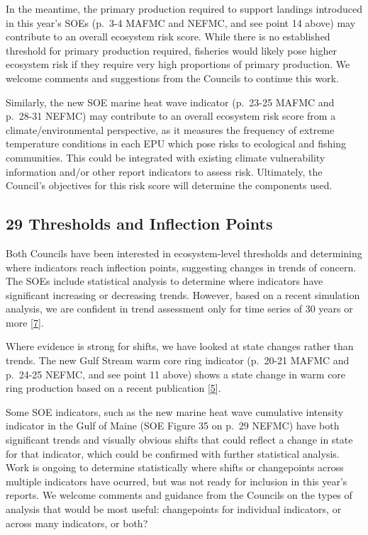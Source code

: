 \documentclass[
  10pt,
]{article}
\begin{document}
In the meantime, the primary production required to support landings
introduced in this year's SOEs (p.~3-4 MAFMC and NEFMC, and see point 14
above) may contribute to an overall ecosystem risk score. While there is
no established threshold for primary production required, fisheries
would likely pose higher ecosystem risk if they require very high
proportions of primary production. We welcome comments and suggestions
from the Councils to continue this work.

Similarly, the new SOE marine heat wave indicator (p.~23-25 MAFMC and
p.~28-31 NEFMC) may contribute to an overall ecosystem risk score from a
climate/environmental perspective, as it measures the frequency of
extreme temperature conditions in each EPU which pose risks to
ecological and fishing communities. This could be integrated with
existing climate vulnerability information and/or other report
indicators to assess risk. Ultimately, the Council's objectives for this
risk score will determine the components used.

\hypertarget{thresholds-and-inflection-points}{%
\subsection{29 Thresholds and Inflection
Points}\label{thresholds-and-inflection-points}}

Both Councils have been interested in ecosystem-level thresholds and
determining where indicators reach inflection points, suggesting changes
in trends of concern. The SOEs include statistical analysis to determine
where indicators have significant increasing or decreasing trends.
However, based on a recent simulation analysis, we are confident in
trend assessment only for time series of 30 years or more
{[}\protect\hyperlink{ref-hardison_simulation_2019}{7}{]}.

Where evidence is strong for shifts, we have looked at state changes
rather than trends. The new Gulf Stream warm core ring indicator
(p.~20-21 MAFMC and p.~24-25 NEFMC, and see point 11 above) shows a
state change in warm core ring production based on a recent publication
{[}\protect\hyperlink{ref-gangopadhyay_observed_2019}{5}{]}.

Some SOE indicators, such as the new marine heat wave cumulative
intensity indicator in the Gulf of Maine (SOE Figure 35 on p.~29 NEFMC)
have both significant trends and visually obvious shifts that could
reflect a change in state for that indicator, which could be confirmed
with further statistical analysis. Work is ongoing to determine
statistically where shifts or changepoints across multiple indicators
have ocurred, but was not ready for inclusion in this year's reports. We
welcome comments and guidance from the Councils on the types of analysis
that would be most useful: changepoints for individual indicators, or
across many indicators, or both?
\end{document}
